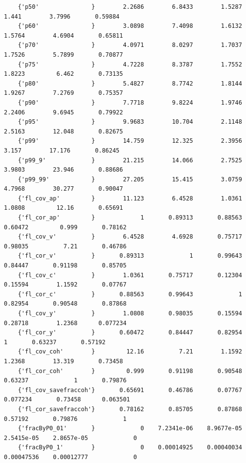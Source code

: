 \documentclass[
]{book}
\begin{document}
\begin{verbatim}
    {'p50'               }        2.2686        6.8433        1.5287         1.441        3.7996       0.59884 
    {'p60'               }        3.0898        7.4098        1.6132        1.5764        4.6904       0.65811 
    {'p70'               }        4.0971        8.0297        1.7037        1.7526        5.7899       0.70877 
    {'p75'               }        4.7228        8.3787        1.7552        1.8223         6.462       0.73135 
    {'p80'               }        5.4827        8.7742        1.8144        1.9267        7.2769       0.75357 
    {'p90'               }        7.7718        9.8224        1.9746        2.2406        9.6945       0.79922 
    {'p95'               }        9.9683        10.704        2.1148        2.5163        12.048       0.82675 
    {'p99'               }        14.759        12.325        2.3956         3.157        17.176       0.86245 
    {'p99_9'             }        21.215        14.066        2.7525        3.9803        23.946       0.88686 
    {'p99_99'            }        27.205        15.415        3.0759        4.7968        30.277       0.90047 
    {'fl_cov_ap'         }        11.123        6.4528        1.0361        1.0808         12.16       0.65691 
    {'fl_cor_ap'         }             1       0.89313       0.88563       0.60472         0.999       0.78162 
    {'fl_cov_v'          }        6.4528        4.6928       0.75717       0.98035          7.21       0.46786 
    {'fl_cor_v'          }       0.89313             1       0.99643       0.84447       0.91198       0.85705 
    {'fl_cov_c'          }        1.0361       0.75717       0.12304       0.15594        1.1592       0.07767 
    {'fl_cor_c'          }       0.88563       0.99643             1       0.82954       0.90548       0.87868 
    {'fl_cov_y'          }        1.0808       0.98035       0.15594       0.28718        1.2368      0.077234 
    {'fl_cor_y'          }       0.60472       0.84447       0.82954             1       0.63237       0.57192 
    {'fl_cov_coh'        }         12.16          7.21        1.1592        1.2368        13.319       0.73458 
    {'fl_cor_coh'        }         0.999       0.91198       0.90548       0.63237             1       0.79876 
    {'fl_cov_savefraccoh'}       0.65691       0.46786       0.07767      0.077234       0.73458      0.063501 
    {'fl_cor_savefraccoh'}       0.78162       0.85705       0.87868       0.57192       0.79876             1 
    {'fracByP0_01'       }             0    7.2341e-06    8.9677e-05    2.5415e-05    2.8657e-05             0 
    {'fracByP0_1'        }             0    0.00014925    0.00040034    0.00047536    0.00012777             0 

\end{verbatim}
\end{document}
